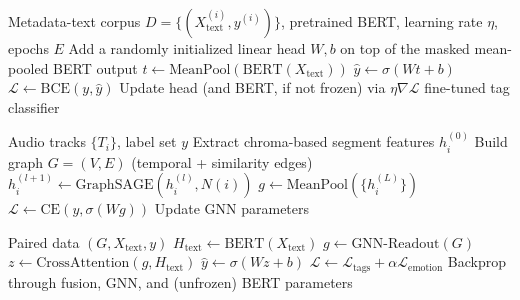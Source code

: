 \documentclass[conference]{IEEEtran}
\begin{document}
\begin{algorithm}[h]
\caption{Task 1: BERT Multi-Label Tag Classifier}
\begin{algorithmic}[1]
\Require Metadata-text corpus $D = \{(X_{\text{text}}^{(i)}, y^{(i)})\}$, pretrained BERT, learning rate $\eta$, epochs $E$
\State Add a randomly initialized linear head $W, b$ on top of the masked mean-pooled BERT output
    \State $t \gets \text{MeanPool}(\text{BERT}(X_{\text{text}}))$
    \State $\hat{y} \gets \sigma(Wt + b)$
    \State $\mathcal{L} \gets \text{BCE}(y, \hat{y})$
    \State Update head (and BERT, if not frozen) via $\eta \nabla \mathcal{L}$
  \EndFor
\EndFor
\State \Return fine-tuned tag classifier
\end{algorithmic}
\end{algorithm}

\begin{algorithm}[h]
\caption{Task 2: GNN Encoder on Segment Graphs}
\begin{algorithmic}[1]
\Require Audio tracks $\{T_i\}$, label set $y$
  \State Extract chroma-based segment features $h_i^{(0)}$
  \State Build graph $G = (V, E)$ (temporal + similarity edges)
\EndFor
{}
      \State $h_i^{(l+1)} \gets \text{GraphSAGE}(h_i^{(l)}, N(i))$
    \EndFor
    \State $g \gets \text{MeanPool}(\{h_i^{(L)}\})$
    \State $\mathcal{L} \gets \text{CE}(y, \sigma(Wg))$
    \State Update GNN parameters
  \EndFor
\EndFor
\end{algorithmic}
\end{algorithm}

\begin{algorithm}[h]
\caption{Task 3: GNN-BERT Fusion}
\begin{algorithmic}[1]
\Require Paired data $(G, X_{\text{text}}, y)$
\State $H_{\text{text}} \gets \text{BERT}(X_{\text{text}})$
\State $g \gets \text{GNN-Readout}(G)$
\State $z \gets \text{CrossAttention}(g, H_{\text{text}})$ 
\State $\hat{y} \gets \sigma(Wz + b)$
\State $\mathcal{L} \gets \mathcal{L}_{\text{tags}} + \alpha \mathcal{L}_{\text{emotion}}$ 
\State Backprop through fusion, GNN, and (unfrozen) BERT parameters
\end{algorithmic}
\end{algorithm}
\end{document}
